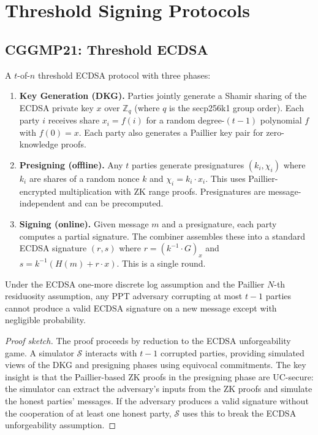 \section{Threshold Signing Protocols}

\label{sec:protocols}

\subsection{CGGMP21: Threshold ECDSA}

\begin{definition}
A $t$-of-$n$ threshold ECDSA protocol with three phases:
\begin{enumerate}[nosep]
  \item \textbf{Key Generation (DKG).}  Parties jointly generate a
        Shamir sharing of the ECDSA private key $x$ over
        $\mathbb{Z}_q$ (where $q$ is the secp256k1 group order).
        Each party $i$ receives share $x_i = f(i)$ for a random
        degree-$(t{-}1)$ polynomial $f$ with $f(0) = x$.  Each party
        also generates a Paillier key pair for zero-knowledge proofs.
  \item \textbf{Presigning (offline).}  Any $t$ parties generate
        presignatures $(k_i, \chi_i)$ where $k_i$ are shares of a
        random nonce $k$ and $\chi_i = k_i \cdot x_i$.  This uses
        Paillier-encrypted multiplication with ZK range proofs.
        Presignatures are message-independent and can be precomputed.
  \item \textbf{Signing (online).}  Given message $m$ and a
        presignature, each party computes a partial signature.  The
        combiner assembles these into a standard ECDSA signature
        $(r, s)$ where $r = (k^{-1} \cdot G)_x$ and
        $s = k^{-1}(H(m) + r \cdot x)$.  This is a single round.
\end{enumerate}
\end{definition}

\begin{theorem}
\label{thm:cggmp-uf}
Under the ECDSA one-more discrete log assumption and the Paillier
$N$-th residuosity assumption, any PPT adversary corrupting at most
$t-1$ parties cannot produce a valid ECDSA signature on a new message
except with negligible probability.
\end{theorem}

\begin{proof}[Proof sketch]
The proof proceeds by reduction to the ECDSA unforgeability game.
A simulator $\mathcal{S}$ interacts with $t-1$ corrupted parties,
providing simulated views of the DKG and presigning phases using
equivocal commitments.  The key insight is that the Paillier-based
ZK proofs in the presigning phase are UC-secure: the simulator can
extract the adversary's inputs from the ZK proofs and simulate the
honest parties' messages.  If the adversary produces a valid signature
without the cooperation of at least one honest party, $\mathcal{S}$
uses this to break the ECDSA unforgeability assumption.
\end{proof}

